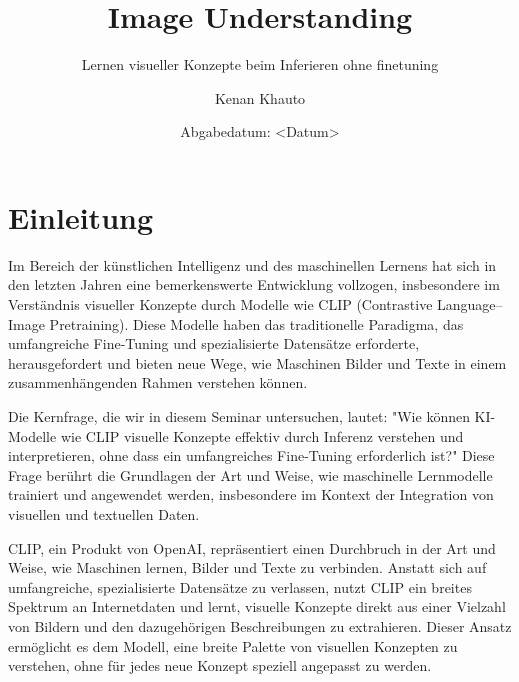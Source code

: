 \documentclass[nolibertine, ngerman, algorithm, nomencl, minted]{ttlab-qualify}
\begin{document}
\titlehead{
  Kenan Khauto\\
  7592047\\
  B.Sc Informatik\\
  Studienfachkombination / Schwerpunkt \\
  6\\
  kenan.khauto@stud.uni-frankfurt.de 
}
\subject{Seminararbeit Text Analytics}
\author{Kenan Khauto}
\title{Image Understanding}
\subtitle{Lernen visueller Konzepte beim Inferieren ohne finetuning}
\date{Abgabedatum: <Datum>}
\publishers{Goethe-Universität Frankfurt am Main\\Prof. Alexander Mehler}

\maketitle


\tableofcontents

\chapter{Einleitung}
Im Bereich der künstlichen Intelligenz und des maschinellen Lernens hat sich in den letzten Jahren eine bemerkenswerte Entwicklung 
vollzogen, insbesondere im Verständnis visueller Konzepte durch Modelle wie CLIP (Contrastive Language–Image Pretraining). 
Diese Modelle haben das traditionelle Paradigma, das umfangreiche Fine-Tuning und spezialisierte Datensätze erforderte, herausgefordert 
und bieten neue Wege, wie Maschinen Bilder und Texte in einem zusammenhängenden Rahmen verstehen können.


Die Kernfrage, die wir in diesem Seminar untersuchen, lautet: "Wie können KI-Modelle wie CLIP visuelle Konzepte effektiv durch 
Inferenz verstehen und interpretieren, ohne dass ein umfangreiches Fine-Tuning erforderlich ist?" Diese Frage berührt die Grundlagen 
der Art und Weise, wie maschinelle Lernmodelle trainiert und angewendet werden, insbesondere im Kontext der Integration von visuellen und 
textuellen Daten.


CLIP, ein Produkt von OpenAI, repräsentiert einen Durchbruch in der Art und Weise, wie Maschinen lernen, Bilder und Texte zu verbinden. 
Anstatt sich auf umfangreiche, spezialisierte Datensätze zu verlassen, nutzt CLIP ein breites Spektrum an Internetdaten und lernt, 
visuelle Konzepte direkt aus einer Vielzahl von Bildern und den dazugehörigen Beschreibungen zu extrahieren. Dieser Ansatz ermöglicht 
es dem Modell, eine breite Palette von visuellen Konzepten zu verstehen, ohne für jedes neue Konzept speziell angepasst zu werden.
\end{document}
